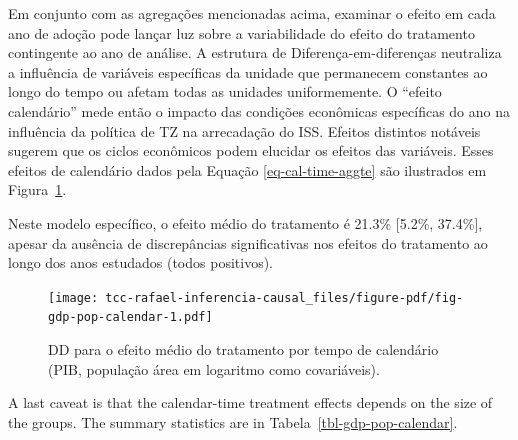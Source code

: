 \documentclass[12pt, a4paper, twoside]{article}
\numberwithin{equation}{subsection} %
\begin{document}
Em conjunto com as agregações mencionadas acima, examinar o efeito em
cada ano de adoção pode lançar luz sobre a variabilidade do efeito do
tratamento contingente ao ano de análise. A estrutura de
Diferença-em-diferenças neutraliza a influência de variáveis
\hspace{0pt}\hspace{0pt}específicas da unidade que permanecem constantes
ao longo do tempo ou afetam todas as unidades uniformemente. O ``efeito
calendário'' mede então o impacto das condições econômicas específicas
do ano na influência da política de TZ na arrecadação do ISS. Efeitos
distintos notáveis \hspace{0pt}\hspace{0pt}sugerem que os ciclos
econômicos podem elucidar os efeitos das variáveis. Esses efeitos de
calendário dados pela Equação \eqref{eq-cal-time-aggte} são ilustrados
em Figura~\ref{fig-gdp-pop-calendar}.

Neste modelo específico, o efeito médio do tratamento é 21.3\% {[}5.2\%,
37.4\%{]}, apesar da ausência de discrepâncias significativas nos
efeitos do tratamento ao longo dos anos estudados (todos positivos).

\begin{figure}[H]

{\centering \texttt{[image: tcc-rafael-inferencia-causal\_files/figure-pdf/fig-gdp-pop-calendar-1.pdf]}

}

\caption{\label{fig-gdp-pop-calendar}DD para o efeito médio do
tratamento por tempo de calendário (PIB, população área em logaritmo
como covariáveis).}

\end{figure}

A last caveat is that the calendar-time treatment effects depends on the
size of the groups. The summary statistics are in
Tabela~\ref{tbl-gdp-pop-calendar}.
\end{document}
